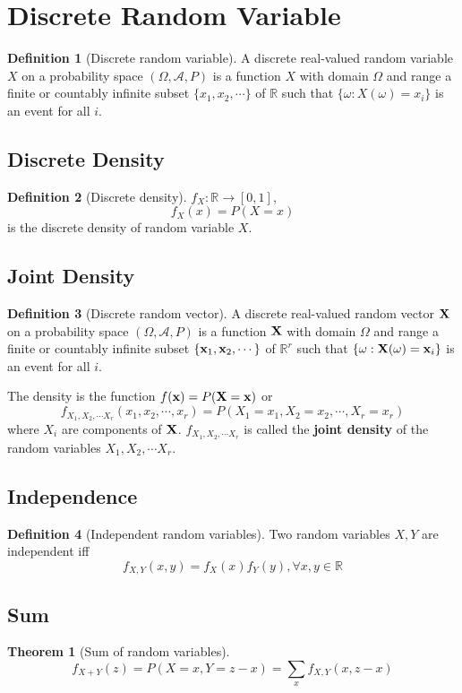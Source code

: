 \documentclass[10pt, a4paper]{extarticle}
\theoremstyle{definition}
\newtheorem{thm}{Theorem}
\newtheorem{defn}{Definition}
\begin{document}
\section{Discrete Random Variable}
\begin{defn}[Discrete random variable]
	A discrete real-valued random variable $X$ on a probability space $(\Omega,\mathscr{A},P)$ is a function $X$ with domain $\Omega$ and range a
	finite or countably infinite subset $\{x_1,x_2,\cdots\}$ of $\mathbb{R}$
	such that $\{\omega : X(\omega) = x_i\}$ is an event for all $i$.
\end{defn}

\subsection{Discrete Density}
\begin{defn}[Discrete density]
	$f_X:\mathbb{R}\to[0,1]$,
	\[f_X(x)=P(X=x)\]
	is the discrete density of random variable $X$.
\end{defn}

\subsection{Joint Density}
\begin{defn}[Discrete random vector]
	A discrete real-valued random vector $\vb{X}$ on a probability space $(\Omega,\mathscr{A},P)$ is a function $\vb{X}$ with domain $\Omega$ and range a
	finite or countably infinite subset $\{\vb{x}_1,\vb{x}_2,\cdots\}$ of $\mathbb{R}^r$
	such that $\{\omega : \vb{X}(\omega) = \vb{x}_i\}$ is an event for all $i$.

	The density is the function $f(\vb{x})=P(\vb{X}=\vb{x})$ or
	\[f_{X_1,X_2,\cdots X_r}(x_1,x_2,\cdots,x_r)=P(X_1=x_1,X_2=x_2,\cdots,X_r=x_r)\] where $X_i$ are components of $\vb{X}$. $f_{X_1,X_2,\cdots X_r}$ is called the \textbf{joint density} of the random variables $X_1,X_2,\cdots X_r$.
\end{defn}

\subsection{Independence}
\begin{defn}[Independent random variables]
	Two random variables $X,Y$ are independent iff
	\[f_{X,Y}(x,y)=f_X(x)f_Y(y),\forall x,y\in\mathbb{R}\]
\end{defn}

\subsection{Sum}
\begin{thm}[Sum of random variables]
	\[f_{X+Y}(z)=P(X=x,Y=z-x)=\sum_x f_{X,Y}(x,z-x)\]
\end{thm}
\end{document}
